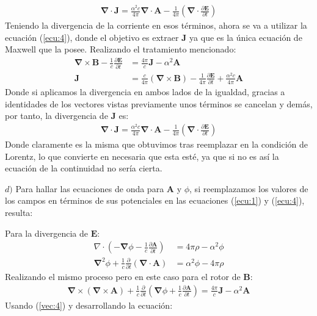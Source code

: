 \begin{multicols}{2}
\begin{align*}
    \mathbf{\nabla} \cdot \mathbf{J} = \frac{\alpha^{2}c}{4\pi} \mathbf{\nabla} \cdot \mathbf{A} - \frac{1}{4\pi} \left(\mathbf{\nabla}\cdot\frac{\partial \mathbf{E}}{\partial t}\right)
\end{align*}
Teniendo la divergencia de la corriente en esos términos, ahora se va a utilizar la ecuación (\ref{ecu:4}), donde el objetivo es extraer $\mathbf{J}$ ya que es la única ecuación de Maxwell que la posee. Realizando el tratamiento mencionado:
\begin{align*}
    \mathbf{\nabla} \times \mathbf{B} - \frac{1}{c} \frac{\partial \mathbf{E}}{\partial t} &= \frac{4\pi}{c} \mathbf{J} - \alpha^{2} \mathbf{A}\\
    \mathbf{J} &= \frac{c}{4\pi} \left(\mathbf{\nabla} \times \mathbf{B}\right) - \frac{1}{4\pi} \frac{\partial \mathbf{E}}{\partial t} + \frac{\alpha^{2} c}{4\pi} \mathbf{A}
\end{align*}
Donde si aplicamos la divergencia en ambos lados de la igualdad, gracias a identidades de los vectores vistas previamente unos términos se cancelan y demás, por tanto, la divergencia de $\mathbf{J}$ es:
\begin{align*}
    \mathbf{\nabla} \cdot \mathbf{J} = \frac{\alpha^{2}c}{4\pi} \mathbf{\nabla} \cdot \mathbf{A} - \frac{1}{4\pi} \left(\mathbf{\nabla}\cdot\frac{\partial \mathbf{E}}{\partial t}\right)
\end{align*}
Donde claramente es la misma que obtuvimos tras reemplazar en la condición de Lorentz, lo que convierte en necesaria que esta esté, ya que si no es así la ecuación de la continuidad no sería cierta.

$d)$ Para hallar las ecuaciones de onda para $\mathbf{A}$ y $\phi$, si reemplazamos los valores de los campos en términos de sus potenciales en las ecuaciones (\ref{ecu:1}) y (\ref{ecu:4}), resulta:

Para la divergencia de $\mathbf{E}$:
\begin{align*}
    \mathbb{\nabla} \cdot \left(-\mathbf{\nabla}\phi - \frac{1}{c} \frac{\partial \mathbf{A}}{\partial t}\right) &= 4\pi \rho - \alpha^{2} \phi\\
    \mathbf{\nabla}^{2} \phi + \frac{1}{c} \frac{\partial}{\partial t} \left(\mathbf{\nabla} \cdot \mathbf{A}\right) &= \alpha^{2} \phi - 4\pi \rho
\end{align*}
Realizando el mismo proceso pero en este caso para el rotor de $\mathbf{B}$:
\begin{align*}
    \mathbf{\nabla} \times \left(\mathbf{\nabla} \times \mathbf{A}\right) + \frac{1}{c} \frac{\partial}{\partial t}\left( \mathbf{\nabla} \phi + \frac{1}{c} \frac{\partial \mathbf{A}}{\partial t}\right) = \frac{4\pi}{c} \mathbf{J} - \alpha^{2} \mathbf{A}
\end{align*}
Usando (\ref{vec:4}) y desarrollando la ecuación:

\end{multicols}

